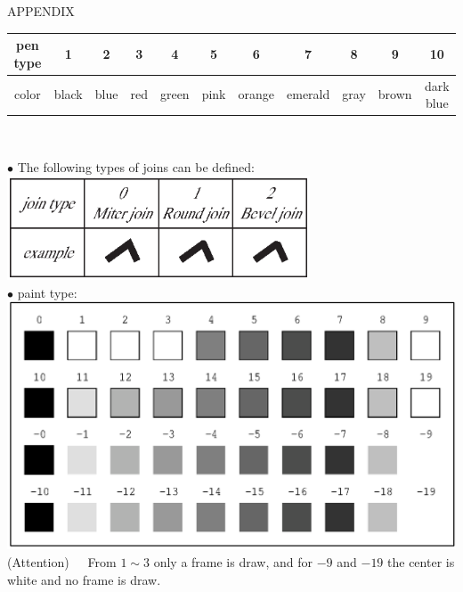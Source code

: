 \begin{qsection}{APPENDIX}
\begin{center}
\begin{tabular}{|c|c|c|c|c|c|c|c|c|c|c|}
 \hline
 pen type& 1& 2& 3& 4& 5& 6& 7& 8& 9&10  \\ \hline
 color   & black& blue& red& green& pink& orange& emerald& gray&brown & 
 dark blue \\ \hline
\end{tabular}\\
\end{center}

\vspace{5mm}
\hypertarget{join-type}{}
{\large \hspace{-1.5ex}$\bullet$ 
The following types of joins can be defined:}\\
\includegraphics[width=9cm]{fig/join-type.eps}\\

\vspace{5mm}
{\large \hspace{-1.5ex}$\bullet$ paint type:}\\
\includegraphics{fig/paint.eps}\\
(Attention)~~~From $1 \sim 3$ only a frame is draw,
and for $-9$ and $-19$ the center is white and no frame is draw.

\end{qsection}
